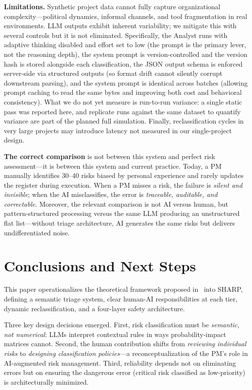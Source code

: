 \documentclass[runningheads]{llncs}
\begin{document}
\textbf{Limitations.} Synthetic project data cannot fully capture organizational complexity---political dynamics, informal channels, and tool fragmentation in real environments. LLM outputs exhibit inherent variability; we mitigate this with several controls but it is not eliminated. Specifically, the Analyst runs with adaptive thinking disabled and effort set to low (the prompt is the primary lever, not the reasoning depth), the system prompt is version-controlled and the version hash is stored alongside each classification, the JSON output schema is enforced server-side via structured outputs (so format drift cannot silently corrupt downstream parsing), and the system prompt is identical across batches (allowing prompt caching to read the same bytes and improving both cost and behavioral consistency). What we do not yet measure is run-to-run variance: a single static pass was reported here, and replicate runs against the same dataset to quantify variance are part of the planned full simulation. Finally, reclassification cycles in very large projects may introduce latency not measured in our single-project design.

\textbf{The correct comparison} is not between this system and perfect risk assessment---it is between this system and current practice. Today, a PM manually identifies 30--40 risks biased by personal experience and rarely updates the register during execution. When a PM misses a risk, the failure is \emph{silent and invisible}; when the AI misclassifies, the error is \emph{traceable, auditable, and correctable}. Moreover, the relevant comparison is not AI versus human, but pattern-structured processing versus the same LLM producing an unstructured flat list---without triage architecture, AI generates the same risks but delivers undifferentiated noise.

\section{Conclusions and Next Steps}

This paper operationalizes the theoretical framework proposed in~\cite{bara2025catania} into SHARP, defining a semantic triage system, clear human-AI responsibilities at each tier, dynamic reclassification, and a four-layer safety architecture.

Three key design decisions emerged. First, risk classification must be \emph{semantic, not numerical}: LLMs interpret contextual rules in ways probability-impact matrices cannot. Second, the human contribution shifts from \emph{reviewing individual risks} to \emph{designing classification policies}---a reconceptualization of the PM's role in AI-augmented risk management. Third, reliability depends not on eliminating errors but on ensuring the dangerous error (critical risk classified as low-priority) is architecturally minimized.
\end{document}
